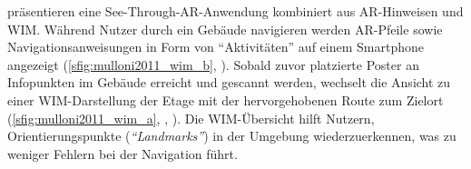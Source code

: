 \textcites{Mulloni2011a}{Mulloni2012} präsentieren eine See-Through-AR-Anwendung kombiniert aus AR-Hinweisen und WIM.\@
Während Nutzer durch ein Gebäude navigieren werden AR-Pfeile sowie Navigationsanweisungen in Form von \enquote{Aktivitäten} auf einem Smartphone angezeigt (\autoref{sfig:mulloni2011_wim_b}, ).
Sobald zuvor platzierte Poster an Infopunkten im Gebäude erreicht und gescannt werden, wechselt die Ansicht zu einer WIM-Darstellung der Etage mit der hervorgehobenen Route zum Zielort (\autoref{sfig:mulloni2011_wim_a}, , ).
Die WIM-Übersicht hilft Nutzern, Orientierungspunkte (\emph{\enquote{Landmarks}}) in der Umgebung wiederzuerkennen, was zu weniger Fehlern bei der Navigation führt.

